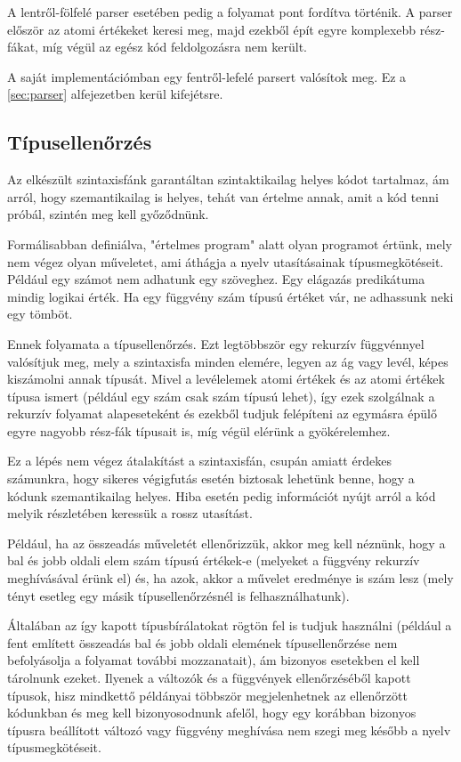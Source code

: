 A lentről-fölfelé parser esetében pedig a folyamat pont fordítva történik. A parser először az atomi értékeket keresi meg, majd ezekből épít egyre komplexebb rész-fákat, míg végül az egész kód feldolgozásra nem került.

A saját implementációmban egy fentről-lefelé parsert valósítok meg. Ez a \ref{sec:parser} alfejezetben kerül kifejétsre.

\subsection{Típusellenőrzés}
\label{sec:typecheck_tech}

Az elkészült szintaxisfánk garantáltan szintaktikailag helyes kódot tartalmaz, ám arról, hogy szemantikailag is helyes, tehát van értelme annak, amit a kód tenni próbál, szintén meg kell győződnünk.

Formálisabban definiálva, "értelmes program" alatt olyan programot értünk, mely nem végez olyan műveletet, ami áthágja a nyelv utasításainak típusmegkötéseit. Például egy számot nem adhatunk egy szöveghez. Egy elágazás predikátuma mindig logikai érték. Ha egy függvény szám típusú értéket vár, ne adhassunk neki egy tömböt.

Ennek folyamata a típusellenőrzés. Ezt legtöbbször egy rekurzív függvénnyel valósítjuk meg, mely a szintaxisfa minden elemére, legyen az ág vagy levél, képes kiszámolni annak típusát. Mivel a levélelemek atomi értékek és az atomi értékek típusa ismert (például egy szám csak szám típusú lehet), így ezek szolgálnak a rekurzív folyamat alapeseteként és ezekből tudjuk felépíteni az egymásra épülő egyre nagyobb rész-fák típusait is, míg végül elérünk a gyökérelemhez.

Ez a lépés nem végez átalakítást a szintaxisfán, csupán amiatt érdekes számunkra, hogy sikeres végigfutás esetén biztosak lehetünk benne, hogy a kódunk szemantikailag helyes. Hiba esetén pedig információt nyújt arról a kód melyik részletében keressük a rossz utasítást.

Például, ha az összeadás műveletét ellenőrizzük, akkor meg kell néznünk, hogy a bal és jobb oldali elem szám típusú értékek-e (melyeket a függvény rekurzív meghívásával érünk el) és, ha azok, akkor a művelet eredménye is szám lesz (mely tényt esetleg egy másik típusellenőrzésnél is felhasználhatunk).

Általában az így kapott típusbírálatokat rögtön fel is tudjuk használni (például a fent említett összeadás bal és jobb oldali elemének típusellenőrzése nem befolyásolja a folyamat további mozzanatait), ám bizonyos esetekben el kell tárolnunk ezeket. Ilyenek a változók és a függvények ellenőrzéséből kapott típusok, hisz mindkettő példányai többször megjelenhetnek az ellenőrzött kódunkban és meg kell bizonyosodnunk afelől, hogy egy korábban bizonyos típusra beállított változó vagy függvény meghívása nem szegi meg később a nyelv típusmegkötéseit.

